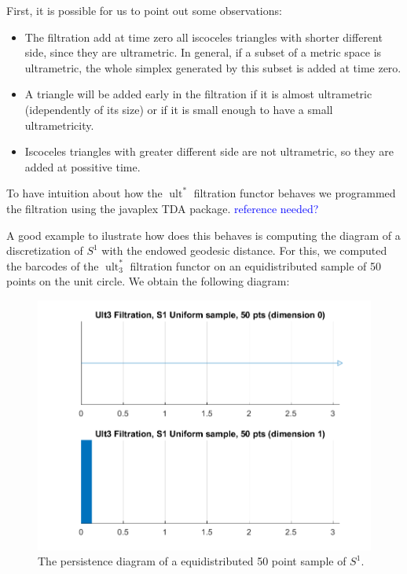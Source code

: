 \documentclass[a4paper,12pt,reqno, english]{amsart}
\DeclareMathOperator{\ult}{ult}
\theoremstyle{plain}
\theoremstyle{definition}
\newcommand{\jose}[1]{\textcolor{blue}{#1} }
\begin{document}
{{First, it is possible for us to point out some observations:
\begin{itemize}
	\item The filtration add at time zero all iscoceles triangles with shorter different side, since they are ultrametric. In general, if a subset of a metric space is ultrametric, the whole simplex generated by this subset is added at time zero.
    \item A triangle will be added early in the filtration if it is almost ultrametric (idependently of its size) or if it is small enough to have a small ultrametricity.
    \item Iscoceles triangles with greater different side are not ultrametric, so they are added at possitive time.
\end{itemize}

To have intuition about how the $\ult^*$ filtration functor behaves we programmed the filtration using the javaplex TDA package. \jose{reference needed?}

A good example to ilustrate how does this behaves is computing the diagram of a discretization of $S^1$ with the endowed geodesic distance. For this, we computed the barcodes of the $\ult^*_3$ filtration functor on an equidistributed sample of 50 points on the unit circle. We obtain the following diagram:

\begin{figure}
	\includegraphics[scale=0.8]{Ult3FiltrationS1Uniformsample50pts.png}
    \caption{The persistence diagram of a equidistributed 50 point sample of $S^1$. }
\end{figure}

}}
\end{document}
